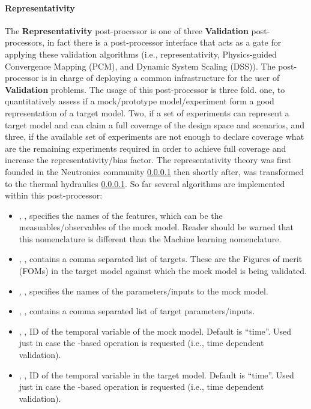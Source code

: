 \paragraph{Representativity}
The \textbf{Representativity} post-processor is one of three \textbf{Validation} post-processors, in fact there is a
post-processor interface that acts as a gate for applying these validation algorithms
(i.e., representativity, Physics-guided Convergence Mapping (PCM), and Dynamic System Scaling (DSS)).
The post-processor is in charge of deploying a common infrastructure for the user of  \textbf{Validation} problems.
The usage of this post-processor is three fold. one, to quantitatively assess if a mock/prototype model/experiment
form a good representation of a target model. Two, if  a set of experiments can represent a target model and can
claim a full coverage of the design space and scenarios, and three, if the available set of experiments are not
enough to declare coverage what are the remaining experiments required in order to achieve full coverage and
increase the representativity/bias factor. The representativity theory was first founded in the
Neutronics community \ref{} then shortly after, was transformed to the thermal hydraulics \ref{}.
So far several algorithms are implemented within this post-processor:
%
%

\begin{itemize}
  \item {}, , specifies the names of  the features, which can be the measuables/observables of the mock model. Reader should be warned that this nomenclature is different than the Machine learning nomenclature.

  \item {}, , contains a comma separated list of
     targets. These are the Figures of merit (FOMs) in the target model against which the mock model is being validated.

    \item {}, , specifies the names of  the parameters/inputs to the mock model.

    \item {}, , contains a comma separated list of
    target parameters/inputs.

        \item {},  , ID of the temporal variable of the mock model. Default is ``time''.
        \nb Used just in case the  -based operation  is requested (i.e., time dependent validation).
        \item {}, , ID of the temporal variable in the target model. Default is ``time''.
        \nb Used just in case the  -based operation  is requested (i.e., time dependent validation).
\end{itemize}


